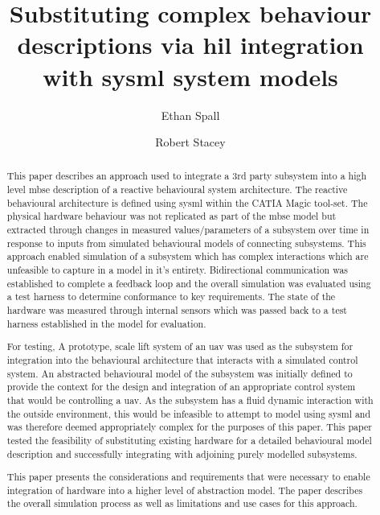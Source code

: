 \documentclass[a4paper,12pt]{article}
\title{Substituting complex behaviour descriptions via \acrlong{hil} integration with \acrshort{sysml} system models}
\date{}
\author[1]{Ethan Spall}
\author[2]{Robert Stacey}
\affil[1]{Dassault Syst\`emes}
\affil[2]{\acrfull{amrc} Sheffield}
\begin{document}
\maketitle
{}
\begin{abstract}
This paper describes an approach used to integrate a 3rd party subsystem into a high level \acrshort{mbse} description of a reactive behavioural system architecture. The reactive behavioural architecture is defined using \acrfull{sysml} within the CATIA Magic tool-set. The physical hardware behaviour was not replicated as part of the \acrshort{mbse} model but extracted through changes in measured values/parameters of a subsystem over time in response to inputs from simulated behavioural models of connecting subsystems. This approach enabled simulation of a subsystem which has complex interactions which are unfeasible to capture in a model in it's entirety. Bidirectional communication was established to complete a feedback loop and the overall simulation was evaluated using a test harness to determine conformance to key requirements. The state of the hardware was measured through internal sensors which was passed back to a test harness established in the model for evaluation.

For testing, A prototype, scale lift system of an \acrshort{uav} was used as the subsystem for integration into the behavioural architecture that interacts with a simulated control system. An abstracted behavioural model of the subsystem was initially defined to provide the context for the design and integration of an appropriate control system that would be controlling a \acrshort{uav}. As the subsystem has a fluid dynamic interaction with the outside environment, this would be infeasible to attempt to model using \acrshort{sysml} and was therefore deemed appropriately complex for the purposes of this paper. This paper tested the feasibility of substituting existing hardware for a detailed behavioural model description and successfully integrating with adjoining purely modelled subsystems.

This paper presents the considerations and requirements that were necessary to enable integration of hardware into a higher level of abstraction model. The paper describes the overall simulation process as well as limitations and use cases for this approach.
\end{abstract}
\end{document}
